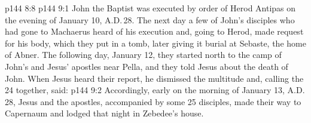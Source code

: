 \vs p144 8:8 
\vs p144 9:1 John the Baptist was executed by order of Herod Antipas on the evening of January 10, A.D.\,28. The next day a few of John’s disciples who had gone to Machaerus heard of his execution and, going to Herod, made request for his body, which they put in a tomb, later giving it burial at Sebaste, the home of Abner. The following day, January 12, they started north to the camp of John’s and Jesus’ apostles near Pella, and they told Jesus about the death of John. When Jesus heard their report, he dismissed the multitude and, calling the 24 together, said: 
\vs p144 9:2 Accordingly, early on the morning of January 13, A.D.\,28, Jesus and the apostles, accompanied by some 25 disciples, made their way to Capernaum and lodged that night in Zebedee’s house.
\quizlink
